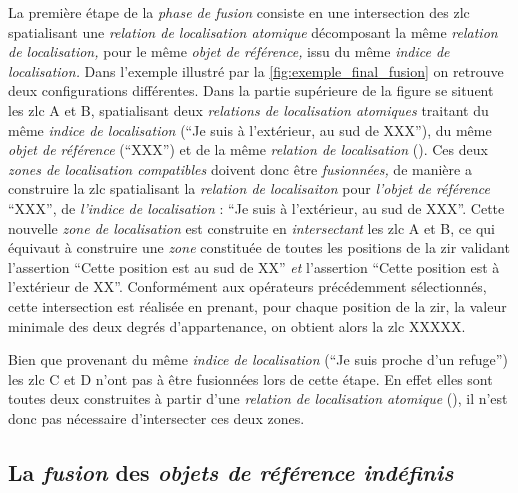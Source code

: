 La première étape de la \emph{phase de fusion} consiste en une
intersection des \ac{zlc} spatialisant une \emph{relation de
  localisation atomique} décomposant la même \emph{relation de
  localisation,} pour le même \emph{objet de référence,} issu du même
\emph{indice de localisation.} Dans l'exemple illustré par la
\autoref{fig:exemple_final_fusion} on retrouve deux configurations
différentes. Dans la partie supérieure de la figure se situent les
\ac{zlc} \textcolor{RdBu-9-1}{\textsf{A}} et
\textcolor{RdBu-9-2}{\textsf{B}}, spatialisant deux \emph{relations de
  localisation atomiques} traitant du même \emph{indice de
  localisation} (\enquote{Je suis à l'extérieur, au sud de XXX}), du
même \emph{objet de référence} (\enquote{XXX}) et de la même
\emph{relation de localisation}
(). Ces deux \emph{zones de
  localisation compatibles} doivent donc être \emph{fusionnées,} de
manière a construire la \ac{zlc} spatialisant la \emph{relation de
  localisaiton}  pour
\emph{l'objet de référence} \enquote{XXX}, de \emph{l'indice de
  localisation} : \enquote{Je suis à l'extérieur, au sud de
  XXX}. Cette nouvelle \emph{zone de localisation} est construite en
\emph{intersectant} les \ac{zlc} \textcolor{RdBu-9-1}{\textsf{A}} et
\textcolor{RdBu-9-2}{\textsf{B}}, ce qui équivaut à construire une
\emph{zone} constituée de toutes les positions de la \ac{zir} validant
l'assertion \enquote{Cette position est au sud de XX} \emph{et}
l'assertion \enquote{Cette position est à l'extérieur de
  XX}. Conformément aux opérateurs précédemment sélectionnés, cette
intersection est réalisée en prenant, pour chaque position de la
\ac{zir}, la valeur minimale des deux degrés d'appartenance, on
obtient alors la \ac{zlc} XXXXX.

Bien que provenant du même \emph{indice de localisation} (\enquote{Je
  suis proche d'un refuge}) les \ac{zlc}
\textcolor{RdBu-9-8}{\textsf{C}} et \textcolor{RdBu-9-9}{\textsf{D}}
n'ont pas à être fusionnées lors de cette étape. En effet elles sont
toutes deux construites à partir d'une \emph{relation de localisation
  atomique} (), il n'est donc pas nécessaire
d'intersecter ces deux zones.

\subsection{La \emph{fusion} des \emph{objets de référence indéfinis}}

